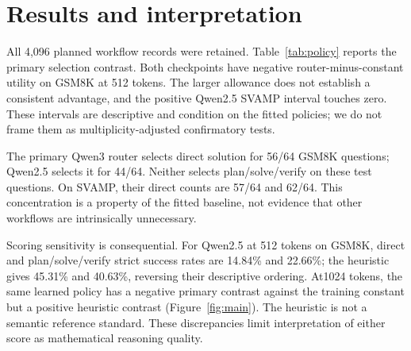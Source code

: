\documentclass[10pt]{article}
\begin{document}
\section{Results and interpretation}
All 4,096 planned workflow records were retained. Table~\ref{tab:policy} reports the primary selection contrast. Both checkpoints have negative router-minus-constant utility on GSM8K at 512 tokens. The larger allowance does not establish a consistent advantage, and the positive Qwen2.5 SVAMP interval touches zero. These intervals are descriptive and condition on the fitted policies; we do not frame them as multiplicity-adjusted confirmatory tests.

The primary Qwen3 router selects direct solution for 56/64 GSM8K questions; Qwen2.5 selects it for 44/64. Neither selects plan/solve/verify on these test questions. On SVAMP, their direct counts are 57/64 and 62/64. This concentration is a property of the fitted baseline, not evidence that other workflows are intrinsically unnecessary.

Scoring sensitivity is consequential. For Qwen2.5 at 512 tokens on GSM8K, direct and plan/solve/verify strict success rates are 14.84\% and 22.66\%; the heuristic gives 45.31\% and 40.63\%, reversing their descriptive ordering. At1024 tokens, the same learned policy has a negative primary contrast against the training constant but a positive heuristic contrast (Figure~\ref{fig:main}). The heuristic is not a semantic reference standard. These discrepancies limit interpretation of either score as mathematical reasoning quality.
\end{document}
